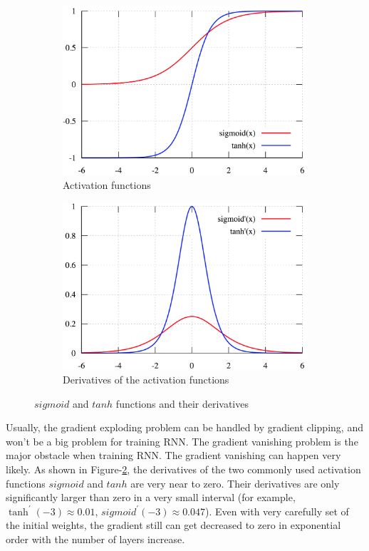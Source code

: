 \documentclass{article}
\begin{document}
\begin{figure}[htbp]
	\begin{subfigure}{0.5\textwidth}
  		\centering
 		 \includegraphics[width=0.95\linewidth]{active}
  		\caption{Activation functions}
  		\label{fig:nnet-active}
	\end{subfigure}
	\begin{subfigure}{0.5\textwidth}
 	 	\centering
 	 	\includegraphics[width=0.95\linewidth]{derivate}
 	 	\caption{Derivatives of the activation functions}
 	 	\label{fig:nnet-derivate}
	\end{subfigure}
	\caption{$sigmoid$ and $tanh$ functions and their derivatives}
	\label{fig:nnet-functions}
\end{figure}


Usually, the gradient exploding problem can be handled by gradient clipping, and won't be a big problem for training RNN. 
The gradient vanishing problem is the major obstacle when training RNN. The gradient vanishing can happen very likely. As shown in Figure-\ref{fig:nnet-derivate}, the derivatives of the two commonly used activation functions $sigmoid$ and $tanh$ are very near to zero. Their derivatives are only significantly larger than zero  in a very small interval (for example, $\tanh^{\prime}(-3) \approx 0.01$, $sigmoid^{\prime}(-3) \approx 0.047$). Even with very carefully set of the initial weights, the gradient still can get decreased to zero in  exponential order with the number of layers increase.
\end{document}
